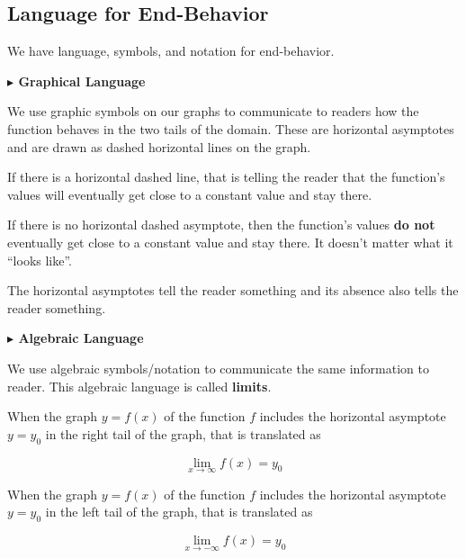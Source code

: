 \documentclass{ximera}
\begin{document}
\subsection*{Language for End-Behavior}


We have language, symbols, and notation for end-behavior. 



\textbf{\textcolor{blue!55!black}{$\blacktriangleright$ Graphical Language}} 


We use graphic symbols on our graphs to communicate to readers how the function behaves in the two tails of the domain.  These are horizontal asymptotes and are drawn as dashed horizontal lines on the graph.

If there is a horizontal dashed line, that is telling the reader that the function's values will eventually get close to a constant value and stay there. 

If there is no horizontal dashed asymptote, then the function's values \textbf{do not} eventually get close to a constant value and stay there. It doesn't matter what it ``looks like''.

The horizontal asymptotes tell the reader something and its absence also tells the reader something. 








\textbf{\textcolor{blue!55!black}{$\blacktriangleright$ Algebraic Language}} 


We use algebraic symbols/notation to communicate the same information to reader.  This algebraic language is called \textbf{limits}. 


When the graph $y = f(x)$ of the function $f$ includes the horizontal asymptote $y = y_0$ in the right tail of the graph, that is translated as


\[
\lim\limits_{x \to \infty}f(x) = y_0
\]





When the graph $y = f(x)$ of the function $f$ includes the horizontal asymptote $y = y_0$ in the left tail of the graph, that is translated as


\[
\lim\limits_{x \to -\infty}f(x) = y_0
\]
\end{document}
